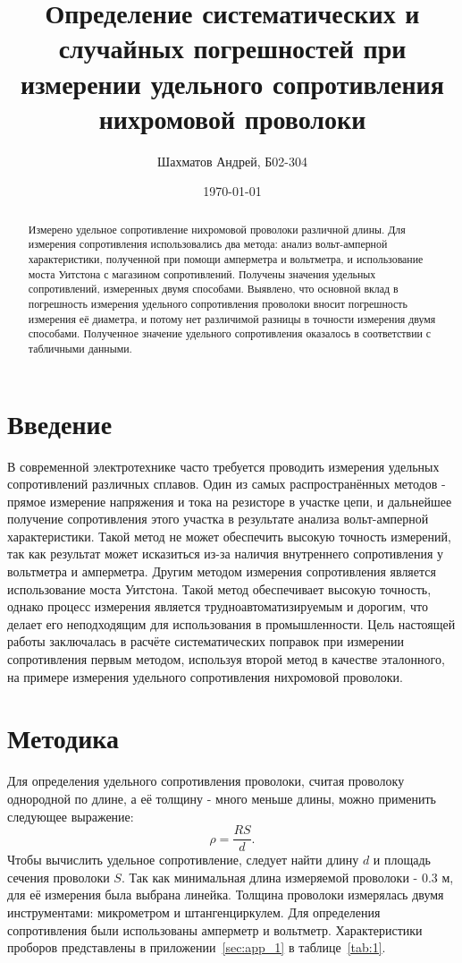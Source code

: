 \documentclass{article}
\title{Определение систематических и случайных погрешностей при измерении удельного сопротивления нихромовой проволоки}
\author{Шахматов Андрей, Б02-304}
\date{\today}
\begin{document}
\maketitle

\begin{abstract}
    Измерено удельное сопротивление нихромовой проволоки различной длины.
    Для измерения сопротивления использовались два метода: анализ вольт-амперной характеристики, 
    полученной при помощи амперметра и вольтметра, и использование моста Уитстона с магазином сопротивлений. Получены значения удельных
    сопротивлений, измеренных двумя способами. Выявлено, что основной вклад в погрешность измерения удельного сопротивления проволоки 
    вносит погрешность измерения её диаметра, и потому нет различимой разницы в точности измерения двумя способами.
    Полученное значение удельного сопротивления оказалось в соответствии с табличными данными.
\end{abstract}

\tableofcontents

\section{Введение}

В современной электротехнике часто требуется проводить измерения удельных сопротивлений различных сплавов.
Один из самых распространённых методов - прямое измерение напряжения и тока на резисторе в участке цепи,
и дальнейшее получение сопротивления этого участка в результате анализа вольт-амперной характеристики. 
Такой метод не может обеспечить высокую точность измерений, 
так как результат может исказиться из-за наличия внутреннего сопротивления у вольтметра и амперметра.
Другим методом измерения сопротивления является использование моста Уитстона. Такой метод обеспечивает 
высокую точность, однако процесс измерения является трудноавтоматизируемым и дорогим, что делает его неподходящим для использования в промышленности.
Цель настоящей работы заключалась в расчёте систематических поправок при измерении сопротивления первым методом, используя второй 
метод в качестве эталонного, на примере измерения удельного сопротивления нихромовой проволоки. 

\section{Методика}
Для определения удельного сопротивления проволоки, считая проволоку однородной по длине, а её толщину - много меньше длины, 
можно применить следующее выражение:
\begin{equation}\label{eq:1}
    \rho = \frac{RS}{d}.
\end{equation}
Чтобы вычислить удельное сопротивление, следует найти длину $d$ и площадь сечения проволоки $S$.
Так как минимальная длина измеряемой проволоки - 0.3 м, для её измерения была выбрана линейка.
Толщина проволоки измерялась двумя инструментами: микрометром и штангенциркулем.
Для определения сопротивления были использованы амперметр и вольтметр. Характеристики проборов представлены в приложении~\ref{sec:app_1}
в таблице~\ref{tab:1}.
\end{document}
